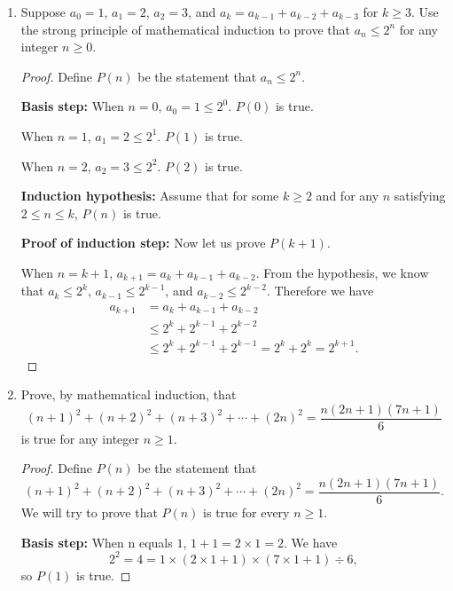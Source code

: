 \documentclass[12pt,a4paper,UTF8]{article}
\theoremstyle{definition}
\begin{document}
\begin{enumerate}
\begin{proof}
        In conclusion, we have derived a contradiction,
        which allows us to conclude that our original assumption is false.
    \end{proof}

    \item
    Suppose $a_0=1$, $a_1=2$, $a_2=3$, and $a_k=a_{k-1}+a_{k-2}+a_{k-3}$ for $k \ge 3$. Use the strong principle of mathematical induction to prove that $a_n \le 2^n$ for any integer $n\ge 0$.
    \begin{proof}
        Define $P(n)$ be the statement that $a_n\leq2^n$.
        
        \textbf{Basis step:} When $n=0$, $a_0=1\leq2^0$. $P(0)$ is true.
        
        When $n=1$, $a_1=2\leq2^1$. $P(1)$ is true.
        
        When $n=2$, $a_2=3\leq2^2$. $P(2)$ is true.
        
     
        
        \textbf{Induction hypothesis:} Assume that for some $k\geq2$ and for any $n$ satisfying $2\leq n\leq k$, $P(n)$ is true.
        
        \textbf{Proof of induction step:} Now let us prove  $P(k + 1)$.
        
        When $n=k+1$, $a_{k+1}=a_k+a_{k-1}+a_{k-2}$. From the hypothesis, we know that $a_k\leq2^k$, $a_{k-1}\leq2^{k-1}$, and $a_{k-2}\leq2^{k-2}$. Therefore we have
        \begin{align*}
        	a_{k+1}&=a_k+a_{k-1}+a_{k-2}\\
        		   &\leq2^k+2^{k-1}+2^{k-2}\\
        		   &\leq2^k+2^{k-1}+2^{k-1}=2^k+2^k=2^{k+1}.
        \end{align*}
        
        
    \end{proof}

    \item
    Prove, by mathematical induction, that
    $$
    (n+1)^2+(n+2)^2+(n+3)^2+\cdots +(2n)^2=\dfrac{n(2n+1)(7n+1)}{6}
    $$
    is true for any integer $n\geq 1$.
    \begin{proof}
        Define $P(n)$ be the statement that 
        $$
        (n+1)^2+(n+2)^2+(n+3)^2+\cdots +(2n)^2=\dfrac{n(2n+1)(7n+1)}{6}.
        $$
         We will try to prove that $P(n)$ is true
        for every $n\geq1$.
        
        \textbf{Basis step:} When n equals $1$, $1+1=2\times1=2$. We have
        $$
        2^2=4=1\times(2\times1+1)\times(7\times1+1)\div6,
        $$
        so $P(1)$ is true.
        

\end{proof}
\end{enumerate}
\end{document}
